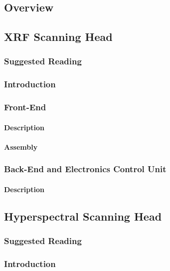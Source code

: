 \subsection{Overview}





\subsection{XRF Scanning Head}

\subsubsection{Suggested Reading}

\subsubsection{Introduction}


\subsubsection{Front-End}

\paragraph{Description}

\paragraph{Assembly}



\subsubsection{Back-End and Electronics Control Unit}

\paragraph{Description}





\subsection{Hyperspectral Scanning Head}

\subsubsection{Suggested Reading}

\subsubsection{Introduction}

